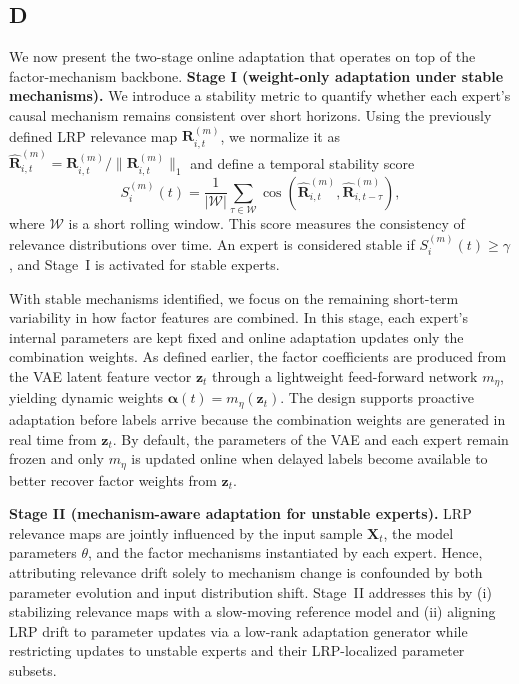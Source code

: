 ﻿\documentclass[journal]{IEEEtran}
\begin{document}
\subsection{D}
We now present the two-stage online adaptation that operates on top of the factor-mechanism backbone.
\textbf{Stage I (weight-only adaptation under stable mechanisms).}
We introduce a stability metric to quantify whether each expert's causal mechanism remains consistent over short horizons. Using the previously defined LRP relevance map $\mathbf{R}_{i,t}^{(m)}$, we normalize it as $\hat{\mathbf{R}}_{i,t}^{(m)}=\mathbf{R}_{i,t}^{(m)}/\|\mathbf{R}_{i,t}^{(m)}\|_{1}$ and define a temporal stability score
\begin{equation}
S_{i}^{(m)}(t)=\frac{1}{|\mathcal{W}|}\sum_{\tau\in\mathcal{W}} \cos\!\left(\hat{\mathbf{R}}_{i,t}^{(m)},\hat{\mathbf{R}}_{i,t-\tau}^{(m)}\right),
\end{equation}
where $\mathcal{W}$ is a short rolling window. This score measures the consistency of relevance distributions over time. An expert is considered stable if $S_{i}^{(m)}(t)\ge\gamma$, and Stage~I is activated for stable experts.

With stable mechanisms identified, we focus on the remaining short-term variability in how factor features are combined. In this stage, each expert's internal parameters are kept fixed and online adaptation updates only the combination weights. As defined earlier, the factor coefficients are produced from the VAE latent feature vector $\mathbf{z}_t$ through a lightweight feed-forward network $m_{\eta}$, yielding dynamic weights $\boldsymbol{\alpha}(t)=m_{\eta}(\mathbf{z}_t)$.
The design supports proactive adaptation before labels arrive because the combination weights are generated in real time from $\mathbf{z}_t$. By default, the parameters of the VAE and each expert remain frozen and only $m_{\eta}$ is updated online when delayed labels become available to better recover factor weights from $\mathbf{z}_t$.

 \textbf{Stage II (mechanism-aware adaptation for unstable experts).}
LRP relevance maps are jointly influenced by the input sample $\mathbf{X}_t$, the model parameters $\theta$, and the factor mechanisms instantiated by each expert. Hence, attributing relevance drift solely to mechanism change is confounded by both parameter evolution and input distribution shift. Stage~II addresses this by (i) stabilizing relevance maps with a slow-moving reference model and (ii) aligning LRP drift to parameter updates via a low-rank adaptation generator while restricting updates to unstable experts and their LRP-localized parameter subsets.
\end{document}
